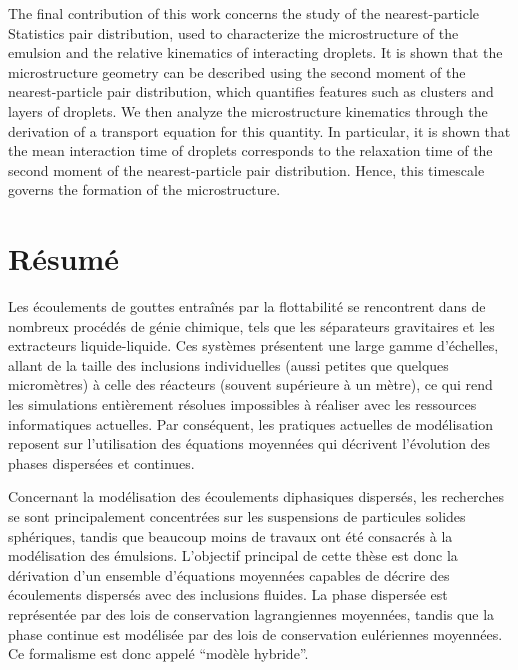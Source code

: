 The final contribution of this work concerns the study of the nearest-particle Statistics pair distribution, used to characterize the microstructure of the emulsion and the relative kinematics   of interacting droplets.
It is shown that the microstructure geometry can be described using the second moment of the nearest-particle pair distribution, which quantifies features such as clusters and layers of droplets.
We then analyze the microstructure kinematics through the derivation of a transport equation for this quantity.
In particular, it is shown that the mean interaction time of droplets corresponds to the relaxation time of the second moment of the nearest-particle pair distribution. 
Hence, this timescale governs the formation of the microstructure.




\newpage
\chapter*{\centering R\'esum\'e}

 
Les \'ecoulements de gouttes entra\^in\'es par la flottabilit\'e se rencontrent dans de nombreux proc\'ed\'es de g\'enie chimique, tels que les s\'eparateurs gravitaires et les extracteurs liquide-liquide.
Ces syst\`emes pr\'esentent une large gamme d'\'echelles, allant de la taille des inclusions individuelles (aussi petites que quelques microm\`etres) \`a celle des r\'eacteurs (souvent sup\'erieure \`a un m\`etre), ce qui rend les simulations enti\`erement r\'esolues impossibles \`a r\'ealiser avec les ressources informatiques actuelles.
Par cons\'equent, les pratiques actuelles de mod\'elisation reposent sur l'utilisation des \'equations moyenn\'ees qui d\'ecrivent l'\'evolution des phases dispers\'ees et continues.


Concernant la mod\'elisation des \'ecoulements diphasiques dispers\'es, les recherches se sont principalement concentr\'ees sur les suspensions de particules solides sph\'eriques, tandis que beaucoup moins de travaux ont \'et\'e consacr\'es \`a la mod\'elisation des \'emulsions.
L'objectif principal de cette th\`ese est donc la d\'erivation d'un ensemble d'\'equations moyen\-n\'ees capables de d\'ecrire des \'ecoulements dispers\'es avec des inclusions fluides. 
La phase dispers\'ee est repr\'esent\'ee par des lois de conservation lagrangiennes  moyenn\'ees, tandis que la phase continue est mod\'elis\'ee par des lois de conservation eul\'eriennes moyenn\'ees.
Ce formalisme est donc appel\'e  ``mod\`ele hybride''.

